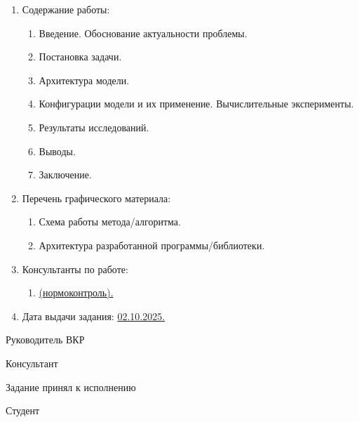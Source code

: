 \begin{enumerate}[1.]
	\printbibliographyTask %
	\item Содержание работы:
	\begin{enumerate}[label=\theenumi\arabic*.]
		\item Введение. Обоснование актуальности проблемы.
		\item Постановка задачи.
		\item Архитектура модели.
		\item Конфигурации модели и их применение. Вычислительные эксперименты.
		\item Результаты исследований.
		\item Выводы.
		\item Заключение. 
	\end{enumerate}
	\item Перечень графического материала: 
	\begin{enumerate}[label=\theenumi\arabic*.]
		\item Схема работы метода/алгоритма.%
		\item Архитектура разработанной программы/библиотеки.%
	\end{enumerate}	

	\item Консультанты по работе:
	\begin{enumerate}[label=\theenumi\arabic*.] 
	\item \uline{\ConsultantNorm{} (нормоконтроль).} %
	\end{enumerate}
		\item Дата выдачи задания: \uline{02.10.2025.}
\end{enumerate}

\intervalS%

Руководитель ВКР \uline{\hspace*{0.1\textheight} \Supervisor}


\intervalS%

Консультант  \uline{\hspace*{0.1\textheight}\ConsultantExtra}


\intervalS%


Задание принял к исполнению \uline{\thesisStartDate}

\intervalS%

Студент \uline{\hspace*{0.1\textheight}  \Author}



